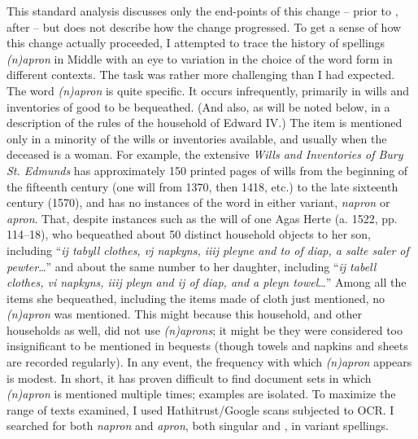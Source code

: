\documentclass[output=paper,
modfonts
]{LSP/langsci}
\begin{document}
This standard analysis discusses only the end-points of this
change -- prior to , after  -- but does not
describe how the change progressed. To get a sense of how this change
actually proceeded, I attempted to trace the history of spellings
\emph{(n)apron} in Middle  with an eye to variation in the choice
of the word form in different contexts. The task was rather more
challenging than I had expected. The word \emph{(n)apron} is quite
specific. It occurs infrequently, primarily in wills and inventories of
good to be bequeathed. (And also, as will be noted below, in a
description of the rules of the household of Edward IV.) The item is
mentioned only in a minority of the wills or inventories available, and
usually when the deceased is a woman. For example, the extensive
\emph{Wills and Inventories of Bury St. Edmunds} has approximately 150
printed pages of wills from the beginning of the fifteenth century (one
will from 1370, then 1418, etc.) to the late sixteenth century (1570),
and has no instances of the word in either variant, \emph{napron} or
\emph{apron}. That, despite instances such as the will of one Agas Herte
(a. 1522, pp. 114--18), who bequeathed about 50 distinct household
objects to her son, including ``\emph{ij tabyll clothes, vj napkyns,
iiij pleyne and to of diap, a salte saler of pewter}\ldots{}'' and about
the same number to her daughter, including ``\emph{ij tabell clothes, vi
napkyns, iiij pleyn and ij of diap, and a pleyn towel}\ldots{}'' Among
all the items she bequeathed, including the items made of cloth just
mentioned, no \emph{(n)apron} was mentioned. This might because this
household, and other households as well, did not use \emph{(n)aprons};
it might be they were considered too insignificant to be mentioned in
bequests (though towels and napkins and sheets are recorded regularly).
In any event, the frequency with which \emph{(n)apron} appears is
modest. In short, it has proven difficult to find document sets in which
\emph{(n)apron} is mentioned multiple times; examples are isolated. To
maximize the range of texts examined, I used Hathitrust/Google scans
subjected to OCR. I searched for both \emph{napron} and \emph{apron},
both singular and , in variant spellings.
\end{document}
